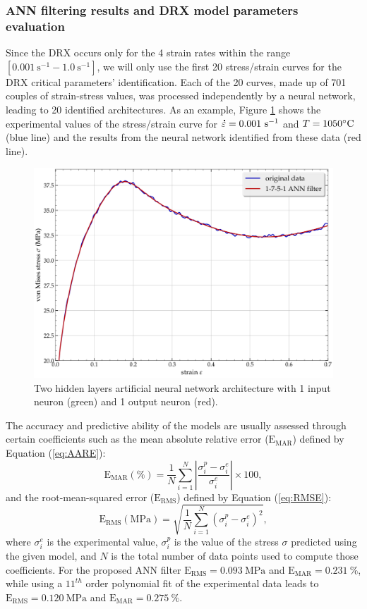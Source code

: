 \documentclass[metals,article,submit,pdftex,moreauthors]{Definitions/mdpi}
\DeclareRobustCommand{\mdot}[1]{\accentset{\mbox{\bfseries .}}{#1}}
\DeclareRobustCommand{\RMSE}{\text{E}_\text{RMS}}
\DeclareRobustCommand{\MARE}{\text{E}_\text{MAR}}
\DeclareRobustCommand{\ps}{\text{s}^{-1}}
\DeclareRobustCommand{\MPa}{\text{MPa}}
\begin{document}
\subsubsection{ANN filtering results and DRX model parameters evaluation\label{subsec:ANNapplication}}
Since the DRX occurs only for the 4 strain rates within the range $[0.001~\ps-1.0~\ps]$, we will only use the first 20 stress/strain curves for the DRX critical parameters' identification.
Each of the 20 curves, made up of 701 couples of strain-stress values, was processed independently by a neural network, leading to 20 identified architectures.
As an example, Figure \ref{fig:AnnFit} shows the experimental values of the stress/strain curve for $\mdot\varepsilon=0.001~\ps$ and $T=1050\celsius$ (blue line) and the results from the neural network identified from these data (red line).
\begin{figure}[H]
\centering
\includegraphics[width=0.7\columnwidth]{Figures/AnnFit}
\caption{Two hidden layers artificial neural network architecture with 1 input neuron (green) and 1 output neuron (red).}
\label{fig:AnnFit}
\end{figure}
The accuracy and predictive ability of the models are usually assessed through certain coefficients such as the mean absolute relative error ($\MARE$) defined by Equation (\ref{eq:AARE}):
\begin{equation}
\MARE(\%) = \frac{1}{N} \sum_{i=1}^{N}{\left|\frac{\sigma_i^p -\sigma_i^e}{\sigma_i^e}\right|} \times 100, \label{eq:AARE}
\end{equation}
and the root-mean-squared error ($\RMSE$) defined by Equation (\ref{eq:RMSE}):
\begin{equation}
\RMSE (\MPa) = \sqrt{\frac{1}{N} \sum_{i=1}^{N} \left(\sigma_i^p - \sigma_i^e\right)^2}, \label{eq:RMSE}
\end{equation}
where $\sigma_i^e$ is the experimental value, $\sigma_i^p$ is the value of the stress $\sigma$ predicted using the given model, and $N$ is the total number of data points used to compute those coefficients.
For the proposed ANN filter $\RMSE=0.093~\MPa$ and $\MARE=0.231~\%$, while using a $11^{th}$ order polynomial fit of the experimental data leads to $\RMSE=0.120~\MPa$ and $\MARE=0.275~\%$.
\end{document}
